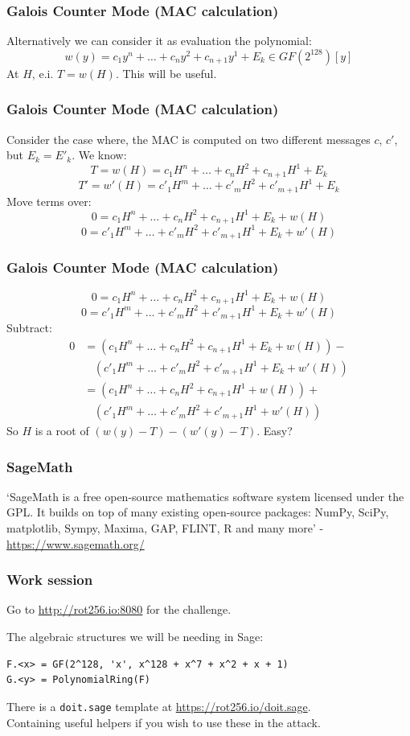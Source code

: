 \documentclass{beamer}
\begin{document}
\begin{frame}
\frametitle{Galois Counter Mode (MAC calculation)}
Alternatively we can consider it as evaluation the polynomial:
\[
    w(y) = c_{1} y^{n} + \ldots + c_{n} y^{2} + c_{n+1} y^{1} + E_{k} \in GF(2^{128})[y]
\]
At $H$, e.i. $T = w(H)$.
This will be useful.
\end{frame}

\begin{frame}
\frametitle{Galois Counter Mode (MAC calculation)}
Consider the case where, the MAC is computed on two different messages $c$, $c'$,
but $E_{k} = E'_{k}$.
We know:
\[
    T = w(H) = c_{1} H^{n} + \ldots + c_{n} H^{2} + c_{n+1} H^{1} + E_{k}
\]
\[
    T' = w'(H) = c'_{1} H^{m} + \ldots + c'_{m} H^{2} + c'_{m+1} H^{1} + E_{k}
\]
Move terms over:
\[
    0 = c_{1} H^{n} + \ldots + c_{n} H^{2} + c_{n+1} H^{1} + E_{k} + w(H)
\]
\[
    0 = c'_{1} H^{m} + \ldots + c'_{m} H^{2} + c'_{m+1} H^{1} + E_{k} + w'(H)
\]
\end{frame}

\begin{frame}
\frametitle{Galois Counter Mode (MAC calculation)}
\[
    0 = c_{1} H^{n} + \ldots + c_{n} H^{2} + c_{n+1} H^{1} + E_{k} + w(H)
\]
\[
    0 = c'_{1} H^{m} + \ldots + c'_{m} H^{2} + c'_{m+1} H^{1} + E_{k} + w'(H)
\]
Subtract:
\begin{align}
    0 &=
    (c_{1} H^{n} + \ldots + c_{n} H^{2} + c_{n+1} H^{1} + E_{k} + w(H)) - \\
    & \ \ \ \ (c'_{1} H^{m} + \ldots + c'_{m} H^{2} + c'_{m+1} H^{1} + E_{k} + w'(H)) \\
    &=(c_{1} H^{n} + \ldots + c_{n} H^{2} + c_{n+1} H^{1} + w(H)) + \\
    & \ \ \ \ (c'_{1} H^{m} + \ldots + c'_{m} H^{2} + c'_{m+1} H^{1} + w'(H))
\end{align}
So $H$ is a root of $(w(y) - T) - (w'(y) - T)$. Easy?
\end{frame}

\begin{frame}
\frametitle{SageMath}
`SageMath is a free open-source mathematics software system licensed under the GPL.
 It builds on top of many existing open-source packages:
 NumPy, SciPy, matplotlib, Sympy, Maxima, GAP, FLINT, R and many more'
 - \url{https://www.sagemath.org/}
\end{frame}

\begin{frame}[fragile]
\frametitle{Work session}

Go to \url{http://rot256.io:8080} for the challenge.

\vspace{3mm}

The algebraic structures we will be needing in Sage:

\begin{verbatim}
F.<x> = GF(2^128, 'x', x^128 + x^7 + x^2 + x + 1)
G.<y> = PolynomialRing(F)
\end{verbatim}

There is a \verb!doit.sage! template at \url{https://rot256.io/doit.sage}. \\
Containing useful helpers if you wish to use these in the attack.

\end{frame}
\end{document}
